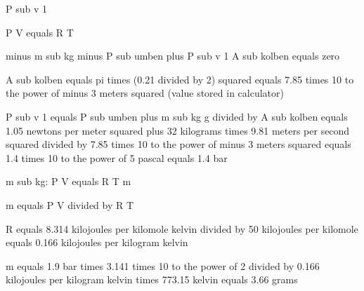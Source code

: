 P sub v 1

P V equals R T

minus m sub kg minus P sub umben plus P sub v 1 A sub kolben equals zero

A sub kolben equals pi times (0.21 divided by 2) squared equals 7.85 times 10 to the power of minus 3 meters squared (value stored in calculator)

P sub v 1 equals P sub umben plus m sub kg g divided by A sub kolben equals 1.05 newtons per meter squared plus 32 kilograms times 9.81 meters per second squared divided by 7.85 times 10 to the power of minus 3 meters squared equals 1.4 times 10 to the power of 5 pascal equals 1.4 bar

m sub kg: P V equals R T m

m equals P V divided by R T

R equals 8.314 kilojoules per kilomole kelvin divided by 50 kilojoules per kilomole equals 0.166 kilojoules per kilogram kelvin

m equals 1.9 bar times 3.141 times 10 to the power of 2 divided by 0.166 kilojoules per kilogram kelvin times 773.15 kelvin equals 3.66 grams